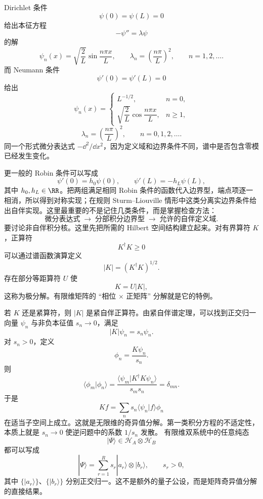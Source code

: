 Dirichlet 条件
\[
\psi(0)=\psi(L)=0
\]
给出本征方程
\[
-\psi''=\lambda\psi
\]
的解
\[
\psi_n(x)=\sqrt{\frac2L}\sin\frac{n\pi x}{L},
\qquad
\lambda_n=\left(\frac{n\pi}{L}\right)^2,
\qquad n=1,2,\ldots.
\]
而 Neumann 条件
\[
\psi'(0)=\psi'(L)=0
\]
给出
\[
\psi_n(x)=
\begin{cases}
L^{-1/2},&n=0,\\[3pt]
\sqrt{\dfrac2L}\cos\dfrac{n\pi x}{L},&n\ge1,
\end{cases}
\]
\[
\lambda_n=\left(\frac{n\pi}{L}\right)^2,
\qquad n=0,1,2,\ldots.
\]
同一个形式微分表达式 $-\dd^2/\dd x^2$，因为定义域和边界条件不同，谱中是否包含零模已经发生变化。

更一般的 Robin 条件可以写成
\[
\psi'(0)=h_0\psi(0),
\qquad
\psi'(L)=-h_L\psi(L),
\]
其中 $h_0,h_L\in\RR$。把两组满足相同 Robin 条件的函数代入边界型，端点项逐一相消，所以得到对称实现；在规则 Sturm--Liouville 情形中这类分离实边界条件给出自伴实现。这里最重要的不是记住几类条件，而是掌握检查方法：
\[
{
\text{微分表达式}
\;\longrightarrow\;
\text{分部积分边界型}
\;\longrightarrow\;
\text{允许的自伴定义域}
}.
\]
要讨论非自伴积分核。这里先把所需的 Hilbert 空间结构建立起来。对有界算符 $K$，正算符
\[
K^\dagger K\ge0
\]
可以通过谱函数演算定义
\[
|K|=(K^\dagger K)^{1/2}.
\]
存在部分等距算符 $U$ 使
\begin{equation*}{K=U|K|},\end{equation*}
这称为极分解。有限维矩阵的 ``相位 $\times$ 正矩阵'' 分解就是它的特例。

若 $K$ 还是紧算符，则 $|K|$ 是紧自伴正算符。由紧自伴谱定理，可以找到正交归一向量 $\psi_n$ 与非负本征值 $s_n\to0$，满足
\[
|K|\psi_n=s_n\psi_n.
\]
对 $s_n>0$，定义
\[
\phi_n=\frac{K\psi_n}{s_n}.
\]
则
\[
\langle\phi_m|\phi_n\rangle
=\frac{\langle\psi_m|K^\dagger K\psi_n\rangle}{s_ms_n}
=\delta_{mn}.
\]
于是
\begin{equation*}{
Kf=\sum_{n}s_n\langle\psi_n|f\rangle\phi_n
}\end{equation*}
在适当子空间上成立。这就是无限维的奇异值分解。第一类积分方程的不适定性，本质上就是 $s_n\to0$ 使逆问题中的系数 $1/s_n$ 发散。
有限维双系统中的任意纯态
\[
|\Psi\rangle\in\mathcal H_A\otimes\mathcal H_B
\]
都可以写成
\begin{equation}
{
|\Psi\rangle
=\sum_{r=1}^{R}s_r|a_r\rangle\otimes|b_r\rangle,
\qquad s_r>0,
}
\label{eq:schmidt-decomposition}
\end{equation}
其中 $\{|a_r\rangle\}$、$\{|b_r\rangle\}$ 分别正交归一。这不是额外的量子公设，而是矩阵奇异值分解的直接结果。

